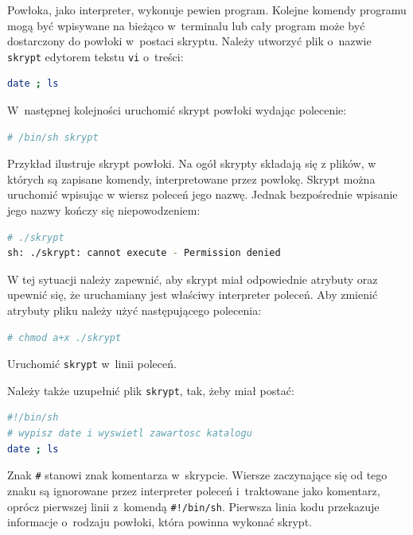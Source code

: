 \documentclass[11pt,twoside,a4paper]{article}
\begin{document}
\begin{example} \label{ex:prostakomenda7} 


Powłoka, jako interpreter, wykonuje pewien program.  Kolejne komendy programu mogą być wpisywane na bieżąco w~terminalu lub cały program może być dostarczony do powłoki w~postaci skryptu. Należy utworzyć plik o~nazwie \lstinline{skrypt} edytorem tekstu \lstinline{vi} o~treści:

\begin{lstlisting}[language=bash]
date ; ls
\end{lstlisting}

W~następnej kolejności uruchomić skrypt powłoki wydając polecenie: 

\begin{lstlisting}[language=bash]
# /bin/sh skrypt
\end{lstlisting}

Przykład ilustruje skrypt powłoki. Na ogół skrypty składają się z plików, w których są zapisane komendy, interpretowane przez powłokę. Skrypt można uruchomić wpisując w wiersz poleceń jego nazwę. Jednak bezpośrednie wpisanie jego nazwy kończy się niepowodzeniem:

\begin{lstlisting}[language=bash]
# ./skrypt
sh: ./skrypt: cannot execute - Permission denied
\end{lstlisting}

W tej sytuacji należy zapewnić, aby skrypt miał odpowiednie atrybuty oraz upewnić się, że uruchamiany jest właściwy interpreter poleceń. Aby zmienić atrybuty pliku należy użyć następującego polecenia:

\begin{lstlisting}[language=bash]
# chmod a+x ./skrypt
\end{lstlisting}

Uruchomić \lstinline{skrypt} w~linii poleceń. 
\end{example}


\begin{example}\label{ex:prostakomenda8} 


Należy także uzupełnić plik \lstinline{skrypt}, tak, żeby miał postać:

\begin{lstlisting}[language=bash]
#!/bin/sh
# wypisz date i wyswietl zawartosc katalogu
date ; ls
\end{lstlisting}

Znak \lstinline{#} stanowi znak komentarza w~skrypcie. Wiersze zaczynające się od tego znaku są ignorowane przez interpreter poleceń i~traktowane jako komentarz, oprócz pierwszej linii z~komendą \lstinline{#!/bin/sh}. Pierwsza linia kodu przekazuje informacje o~rodzaju powłoki, która powinna wykonać skrypt. 
\end{example}
\end{document}
